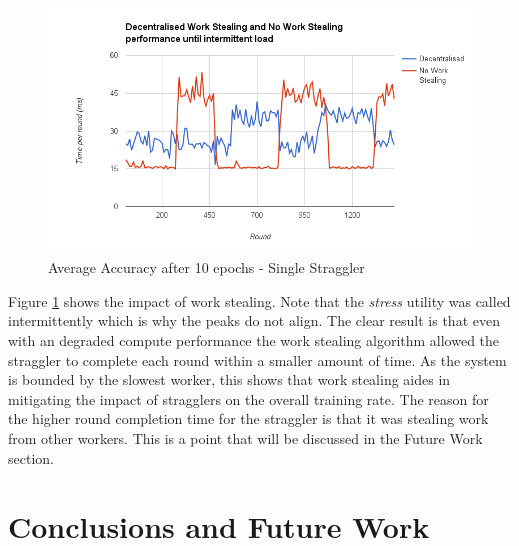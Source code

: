 \documentclass[12pt]{article}
\begin{document}
 \begin{figure}[H]
  \centering
  \includegraphics[width=6in]{DecentralisedVsNo}
  \caption[]{Average Accuracy after 10 epochs - Single Straggler}
  \label{DecentralisedVsNo}
\end{figure}

Figure \ref{DecentralisedVsNo} shows the impact of work stealing. Note that the \textit{stress} utility was called intermittently which is why the peaks do not align. The clear result is that even with an degraded compute performance the work stealing algorithm allowed the straggler to complete each round within a smaller amount of time. As the system is bounded by the slowest worker, this shows that work stealing aides in mitigating the impact of stragglers on the overall training rate.
\newline
\newline
The reason for the higher  round completion time for the straggler is that it was stealing work from other workers. This is a point that will be discussed in the Future Work section.

\newpage

\section{Conclusions and Future Work}
\end{document}
